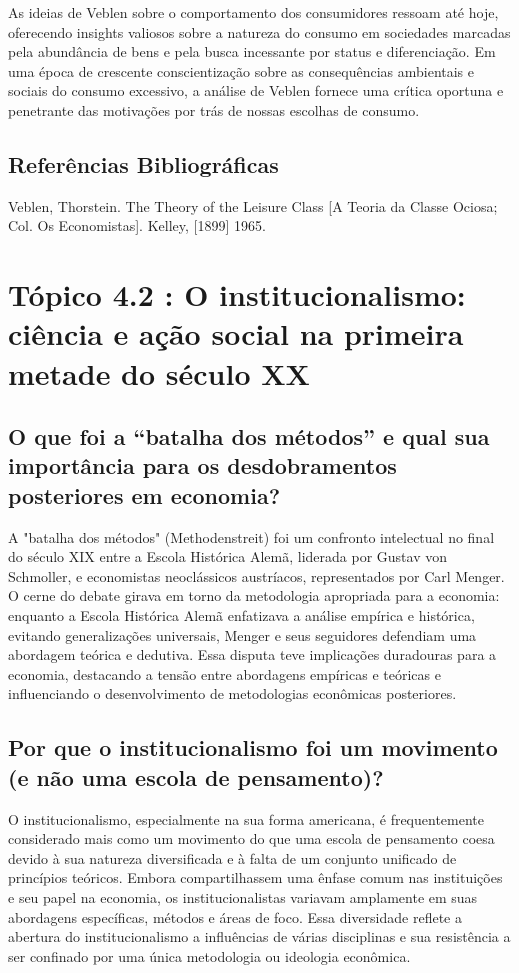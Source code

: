 \documentclass[12pt]{article}
\begin{document}
As ideias de Veblen sobre o comportamento dos consumidores ressoam até hoje, oferecendo insights valiosos sobre a natureza do consumo em sociedades marcadas pela abundância de bens e pela busca incessante por status e diferenciação. Em uma época de crescente conscientização sobre as consequências ambientais e sociais do consumo excessivo, a análise de Veblen fornece uma crítica oportuna e penetrante das motivações por trás de nossas escolhas de consumo.

\subsection{\textbf{Referências Bibliográficas}}
Veblen, Thorstein. The Theory of the Leisure Class [A Teoria da Classe Ociosa; Col. Os
Economistas]. Kelley, [1899] 1965.

\section{\textbf{Tópico 4.2 : O institucionalismo: ciência e ação social na primeira metade do século XX}}
\subsection{\textbf{O que foi a “batalha dos métodos” e qual sua importância para os desdobramentos posteriores em economia?}}
A "batalha dos métodos" (Methodenstreit) foi um confronto intelectual no final do século XIX entre a Escola Histórica Alemã, liderada por Gustav von Schmoller, e economistas neoclássicos austríacos, representados por Carl Menger. O cerne do debate girava em torno da metodologia apropriada para a economia: enquanto a Escola Histórica Alemã enfatizava a análise empírica e histórica, evitando generalizações universais, Menger e seus seguidores defendiam uma abordagem teórica e dedutiva. Essa disputa teve implicações duradouras para a economia, destacando a tensão entre abordagens empíricas e teóricas e influenciando o desenvolvimento de metodologias econômicas posteriores.
\subsection{\textbf{Por que o institucionalismo foi um movimento (e não uma escola de pensamento)?}}
O institucionalismo, especialmente na sua forma americana, é frequentemente considerado mais como um movimento do que uma escola de pensamento coesa devido à sua natureza diversificada e à falta de um conjunto unificado de princípios teóricos. Embora compartilhassem uma ênfase comum nas instituições e seu papel na economia, os institucionalistas variavam amplamente em suas abordagens específicas, métodos e áreas de foco. Essa diversidade reflete a abertura do institucionalismo a influências de várias disciplinas e sua resistência a ser confinado por uma única metodologia ou ideologia econômica.
\end{document}
